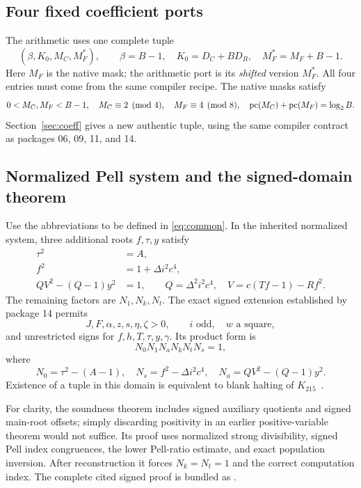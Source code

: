\documentclass[11pt]{article}
\theoremstyle{definition}\newtheorem{definition}[theorem]{Definition}
\theoremstyle{remark}\newtheorem{remark}[theorem]{Remark}
\newcommand{\code}[1]{\texttt{\detokenize{#1}}}
\begin{document}
\subsection{Four fixed coefficient ports}
The arithmetic uses one complete tuple
\[
(\beta,K_0,M_C,M_F^*),\qquad
\beta=B-1,\quad K_0=D_C+BD_R,\quad M_F^*=M_F+B-1.
\]
Here $M_F$ is the native mask; the arithmetic port is its \emph{shifted} version $M_F^*$. All four entries must come from the same compiler recipe. The native masks satisfy
\begin{equation}
0<M_C,M_F<B-1,\quad M_C\equiv2\pmod4,\quad M_F\equiv4\pmod8,
\quad\operatorname{pc}(M_C)+\operatorname{pc}(M_F)=\log_2B.\label{eq:masks}
\end{equation}
Section~\ref{sec:coeff} gives a new authentic tuple, using the same compiler contract as packages 06, 09, 11, and 14.

\subsection{Normalized Pell system and the signed-domain theorem}
Use the abbreviations to be defined in \eqref{eq:common}. In the inherited normalized system, three additional roots $f,\tau,y$ satisfy
\begin{align}
\tau^2&=A,\label{eq:oldfirst}\\
f^2&=1+\Delta i^2c^4,\label{eq:oldstrong}\\
Q V^2-(Q-1)y^2&=1,\qquad
 Q=\Delta^2i^2c^4,\quad V=c(Tf-1)-Rf^2.\label{eq:oldaux}
\end{align}
The remaining factors are $N_1,N_k,N_t$. The exact signed extension established by package 14 permits
\[
J,F,\alpha,z,s,\eta,\zeta>0,\qquad i\text{ odd},\quad w\text{ a square},
\]
and unrestricted signs for $f,h,T,\tau,y,\gamma$. Its product form is
\begin{equation}
N_0N_1N_aN_kN_tN_s=1,\label{eq:signedcontract}
\end{equation}
where
\[
N_0=\tau^2-(A-1),\quad N_s=f^2-\Delta i^2c^4,\quad
N_a=QV^2-(Q-1)y^2.
\]
Existence of a tuple in this domain is equivalent to blank halting of $K_{215}$~\cite{integer29,blank,pell}.

For clarity, the soundness theorem includes signed auxiliary quotients and signed main-root offsets; simply discarding positivity in an earlier positive-variable theorem would not suffice. Its proof uses normalized strong divisibility, signed Pell index congruences, the lower Pell-ratio estimate, and exact population inversion. After reconstruction it forces $N_k=N_t=1$ and the correct computation index. The complete cited signed proof is bundled as \code{upstream/SIGNED_DOMAIN_PROOF.md}.
\end{document}
